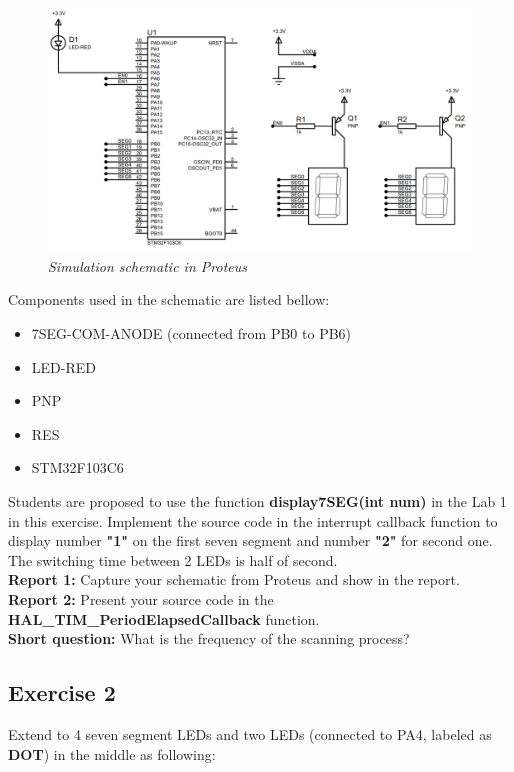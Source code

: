 \begin{figure}[!htp]
    \centering
    \includegraphics[width=5.5in]{source/picture/bai_2/lab2_ex1a.PNG}
    \caption{\textit{Simulation schematic in Proteus}}
    \label{bai2_pic1a}
\end{figure}
Components used in the schematic are listed bellow:
\begin{itemize}
    \item 7SEG-COM-ANODE (connected from PB0 to PB6)
    \item LED-RED
    \item PNP
    \item RES
    \item STM32F103C6
\end{itemize}


Students are proposed to use the function \textbf{display7SEG(int num)} in the Lab 1 in this exercise. Implement the source code in the interrupt callback function to display number \textbf{"1"} on the first seven segment and number \textbf{"2"} for second one. The switching time between 2 LEDs is half of second. \\

\textbf{Report 1: } Capture your schematic from Proteus and show in the report.\\

\textbf{Report 2: } Present your source code in the \textbf{HAL\_TIM\_PeriodElapsedCallback} function.\\

\textbf{Short question: } What is the frequency of the scanning process?\\

\subsection{Exercise 2}
Extend to 4 seven segment LEDs and two LEDs (connected to PA4, labeled as \textbf{DOT}) in the middle as following:

